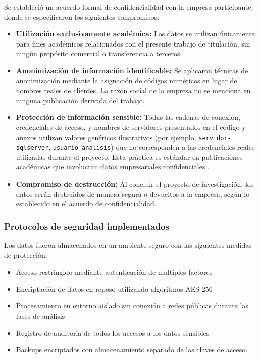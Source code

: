 Se estableció un acuerdo formal de confidencialidad con la empresa participante, donde se especificaron los siguientes compromisos:

\begin{itemize}
    \item \textbf{Utilización exclusivamente académica:} Los datos se utilizan únicamente para fines académicos relacionados con el presente trabajo de titulación, sin ningún propósito comercial o transferencia a terceros.
    
    \item \textbf{Anonimización de información identificable:} Se aplicaron técnicas de anonimización mediante la asignación de códigos numéricos en lugar de nombres reales de clientes. La razón social de la empresa no se menciona en ninguna publicación derivada del trabajo.
    
    \item \textbf{Protección de información sensible:} Todas las cadenas de conexión, credenciales de acceso, y nombres de servidores presentados en el código y anexos utilizan valores genéricos ilustrativos (por ejemplo, \texttt{servidor-sqlserver}, \texttt{usuario\_analisis}) que no corresponden a las credenciales reales utilizadas durante el proyecto. Esta práctica es estándar en publicaciones académicas que involucran datos empresariales confidenciales \cite{barocas2016big}.
    
    \item \textbf{Compromiso de destrucción:} Al concluir el proyecto de investigación, los datos serán destruidos de manera segura o devueltos a la empresa, según lo establecido en el acuerdo de confidencialidad.
\end{itemize}

\subsubsection{Protocolos de seguridad implementados}
Los datos fueron almacenados en un ambiente seguro con las siguientes medidas de protección:

\begin{itemize}
    \item Acceso restringido mediante autenticación de múltiples factores
    \item Encriptación de datos en reposo utilizando algoritmos AES-256
    \item Procesamiento en entorno aislado sin conexión a redes públicas durante las fases de análisis
    \item Registro de auditoría de todos los accesos a los datos sensibles
    \item Backups encriptados con almacenamiento separado de las claves de acceso
\end{itemize}

